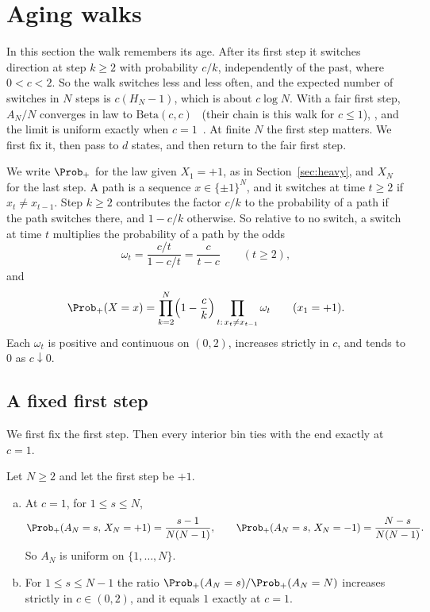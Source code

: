 \section{Aging walks}\label{sec:aging}

In this section the walk remembers its age. After its first step it switches
direction at step $k\ge2$ with probability $c/k$, independently of the past,
where $0<c<2$. So the walk switches less and less often, and the expected
number of switches in $N$ steps is $c(H_N-1)$, which is about $c\log N$. With
a fair first step, $A_N/N$ converges in law to
$\mathrm{Beta}(c,c)$~\cite[Example~1.1 and Theorem~1.4]{ds2007} (their chain
is this walk for $c\le1$), \cite[Theorem~1]{ev2018}, and the limit is uniform
exactly when $c=1$~\cite[Remark~2]{ev2018}. At finite $N$ the first step
matters. We first fix it, then pass to $d$ states, and then return to the
fair first step.

We write $\Prob_+$ for the law given $X_1=+1$, as in
Section~\ref{sec:heavy}, and $X_N$ for the last step. A path is a sequence
$x\in\{\pm1\}^N$, and it switches at time $t\ge2$ if $x_t\ne x_{t-1}$. Step
$k\ge2$ contributes the factor $c/k$ to the probability of a path if the path
switches there, and $1-c/k$ otherwise. So relative to no switch, a switch at
time $t$ multiplies the probability of a path by the odds
\[
 \omega_t=\frac{c/t}{1-c/t}=\frac{c}{t-c}\qquad(t\ge2),
\]
and
\begin{equation}\label{eq:aging-path}
 \Prob_+(X=x)=\prod_{k=2}^N\Bigl(1-\frac ck\Bigr)\prod_{t:\,x_t\ne x_{t-1}}\omega_t
 \qquad(x_1=+1).
\end{equation}
Each $\omega_t$ is positive and continuous on $(0,2)$, increases strictly in
$c$, and tends to $0$ as $c\downarrow0$.

\subsection{A fixed first step}

We first fix the first step. Then every interior bin ties with the end exactly at $c=1$.

\begin{proposition}\label{prop:aging-two}\label{rem:aging}
Let $N\ge2$ and let the first step be $+1$.
\begin{enumerate}[(a)]
\item At $c=1$, for $1\le s\le N$,
\[
 \Prob_+(A_N=s,\,X_N=+1)=\frac{s-1}{N(N-1)},\qquad
 \Prob_+(A_N=s,\,X_N=-1)=\frac{N-s}{N(N-1)}.
\]
So $A_N$ is uniform on $\{1,\dots,N\}$.
\item For $1\le s\le N-1$ the ratio $\Prob_+(A_N=s)/\Prob_+(A_N=N)$ increases
strictly in $c\in(0,2)$, and it equals $1$ exactly at $c=1$.
\end{enumerate}
\end{proposition}

